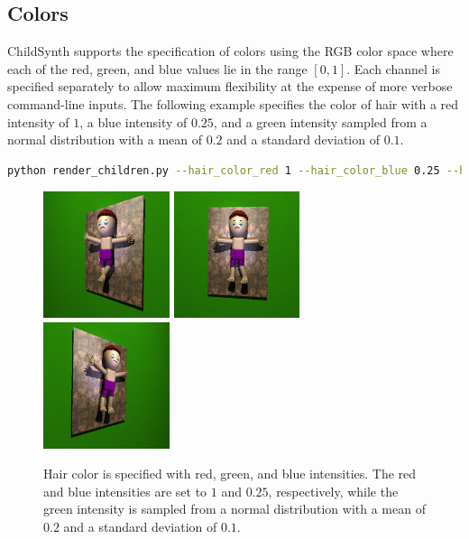 \documentclass{article}
\begin{document}
\subsection{Colors}

ChildSynth supports the specification of colors using the RGB color space where each of the red, green, and blue values lie in the range $[0,1]$. Each channel is specified separately to allow maximum flexibility at the expense of more verbose command-line inputs. The following example specifies the color of hair with a red intensity of $1$, a blue intensity of $0.25$, and a green intensity sampled from a normal distribution with a mean of $0.2$ and a standard deviation of $0.1$.

\begin{lstlisting}[language=bash]
python render_children.py --hair_color_red 1 --hair_color_blue 0.25 --hair_color_green normal:0.5,0.1\end{lstlisting}

\begin{figure}[htbp]
    \centering
    \includegraphics[height=3.7cm]{plots/child_000000_rgb_060.png}
    \includegraphics[height=3.7cm]{plots/child_000000_rgb_090.png}
    \includegraphics[height=3.7cm]{plots/child_000000_rgb_120.png}
    \caption{Hair color is specified with red, green, and blue intensities. The red and blue intensities are set to $1$ and $0.25$, respectively, while the green intensity is sampled from a normal distribution with a mean of $0.2$ and a standard deviation of $0.1$.}
    \label{fig:red_hair}
\end{figure}



\end{document}
